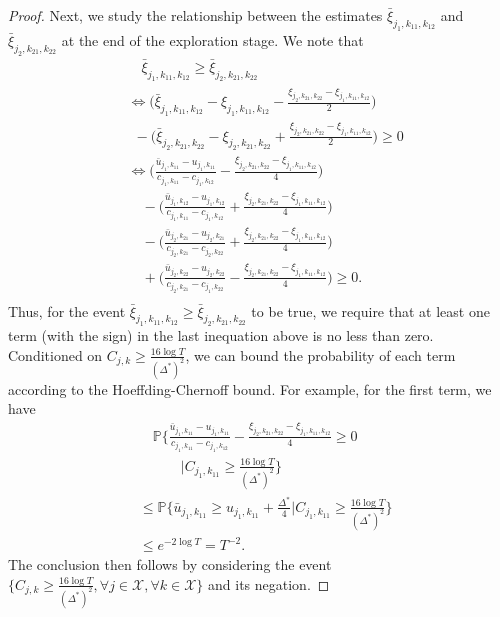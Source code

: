 \begin{proof}
Next, we study the relationship between the estimates $\bar{\xi}_{j_1,k_{11},k_{12}}$ and $\bar{\xi}_{j_2,k_{21},k_{22}} $ at the end of the exploration stage. We note that
\begin{align}
&\quad \bar{\xi}_{j_1,k_{11},k_{12}} \geq \bar{\xi}_{j_2,k_{21},k_{22}}  \nonumber \\
&\Leftrightarrow \big( \bar{\xi}_{j_1,k_{11},k_{12}} - \xi_{j_1,k_{11},k_{12}} - \frac{\xi_{j_2,k_{21},k_{22}}- \xi_{j_1,k_{11},k_{12}}}{2} \big) \nonumber\\
&~~- \big(\bar{\xi}_{j_2,k_{21},k_{22}} -\xi_{j_2,k_{21},k_{22}} + \frac{\xi_{j_2,k_{21},k_{22}}- \xi_{j_1,k_{11},k_{12}}}{2} \big) \geq 0 \nonumber\\
&\Leftrightarrow \big( \frac{\bar{u}_{j_1,k_{11}} - u_{j_1,k_{11}}}{c_{j_1,k_{11}} - c_{j_1,k_{12}}} - \frac{\xi_{j_2,k_{21},k_{22}}- \xi_{j_1,k_{11},k_{12}}}{4} \big) \nonumber\\
&\quad -\big(\frac{\bar{u}_{j_1,k_{12}} - u_{j_1,k_{12}}}{c_{j_1,k_{11}} - c_{j_1,k_{12}}} + \frac{\xi_{j_2,k_{21},k_{22}}- \xi_{j_1,k_{11},k_{12}}}{4} \big) \nonumber\\
& \quad - \big( \frac{\bar{u}_{j_2,k_{21}} - u_{j_2,k_{21}}}{c_{j_2,k_{21}} - c_{j_2,k_{22}}} + \frac{\xi_{j_2,k_{21},k_{22}}- \xi_{j_1,k_{11},k_{12}}}{4} \big) \nonumber\\
& \quad + \big(\frac{\bar{u}_{j_2,k_{22}} - u_{j_2,k_{22}}}{c_{j_2,k_{21}} - c_{j_1,k_{22}}} - \frac{\xi_{j_2,k_{21},k_{22}}- \xi_{j_1,k_{11},k_{12}}}{4} \big) \geq 0.\nonumber\\
\end{align}
Thus, for the event $\bar{\xi}_{j_1,k_{11},k_{12}} \geq \bar{\xi}_{j_2,k_{21},k_{22}}$ to be true, we require that at least one term (with the sign) in the last inequation above is no less than zero. Conditioned on $C_{j,k} \geq \frac{16\log T}{(\Delta^*)^2}$, we can bound the probability of each term according to the Hoeffding-Chernoff bound. For example, for the first term, we have
\begin{align}
&\quad \mathbb{P}\big\{ \frac{\bar{u}_{j_1,k_{11}} - u_{j_1,k_{11}}}{c_{j_1,k_{11}} - c_{j_1,k_{12}}} - \frac{\xi_{j_2,k_{21},k_{22}}- \xi_{j_1,k_{11},k_{12}}}{4} \geq 0 \nonumber \\
& \quad\quad\quad |C_{j_1,k_{11}} \geq \frac{16\log T}{(\Delta^*)^2} \big\} \nonumber \\
& \leq \mathbb{P}\big\{\bar{u}_{j_1,k_{11}} \geq u_{j_1,k_{11}}+  \frac{\Delta^*}{4} |C_{j_1,k_{11}} \geq \frac{16\log T}{(\Delta^*)^2}\big\}\nonumber \\
& \leq e^{-2\log T} = T^{-2}. \nonumber
\end{align}
The conclusion then follows by considering the event  $\big\{C_{j,k} \geq \frac{16\log T}{(\Delta^*)^2}, \forall j \in \mathcal{X}, \forall k \in \mathcal{X}\big\}$ and its negation.
\end{proof}


